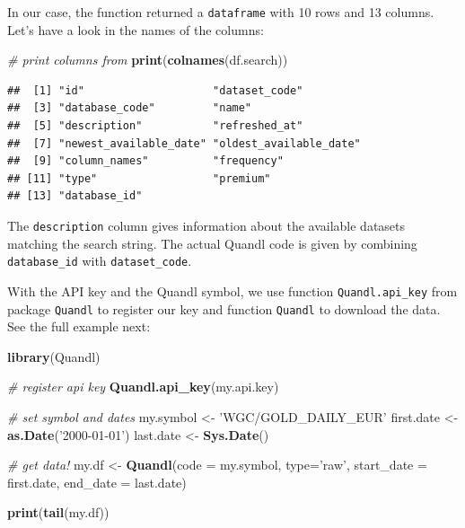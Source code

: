 \documentclass[11pt,]{book}
\newenvironment{Shaded}{\begin{snugshade}}{\end{snugshade}}
\newcommand{\KeywordTok}[1]{\textcolor[rgb]{0.27,0.27,0.27}{\textbf{#1}}}
\newcommand{\DataTypeTok}[1]{\textcolor[rgb]{0.27,0.27,0.27}{#1}}
\newcommand{\StringTok}[1]{\textcolor[rgb]{0.5,0.5,0.5}{#1}}
\newcommand{\CommentTok}[1]{\textcolor[rgb]{0.56,0.35,0.01}{\textit{#1}}}
\newcommand{\NormalTok}[1]{#1}
\begin{document}
In our case, the function returned a \texttt{dataframe} with 10 rows and
13 columns. Let's have a look in the names of the columns:

\begin{Shaded}
\begin{Highlighting}[]
\CommentTok{# print columns from }
\KeywordTok{print}\NormalTok{(}\KeywordTok{colnames}\NormalTok{(df.search))}
\end{Highlighting}
\end{Shaded}

\begin{verbatim}
##  [1] "id"                    "dataset_code"         
##  [3] "database_code"         "name"                 
##  [5] "description"           "refreshed_at"         
##  [7] "newest_available_date" "oldest_available_date"
##  [9] "column_names"          "frequency"            
## [11] "type"                  "premium"              
## [13] "database_id"
\end{verbatim}

The \texttt{description} column gives information about the available
datasets matching the search string. The actual Quandl code is given by
combining \texttt{database\_id} with \texttt{dataset\_code}.

With the API key and the Quandl symbol, we use function
\texttt{Quandl.api\_key} from package \texttt{Quandl} to register our
key and function \texttt{Quandl} to download the data. See the full
example next:  

\begin{Shaded}
\begin{Highlighting}[]
\KeywordTok{library}\NormalTok{(Quandl)}

\CommentTok{# register api key}
\KeywordTok{Quandl.api_key}\NormalTok{(my.api.key)}

\CommentTok{# set symbol and dates}
\NormalTok{my.symbol <-}\StringTok{ 'WGC/GOLD_DAILY_EUR'}
\NormalTok{first.date <-}\StringTok{ }\KeywordTok{as.Date}\NormalTok{(}\StringTok{'2000-01-01'}\NormalTok{)}
\NormalTok{last.date <-}\StringTok{ }\KeywordTok{Sys.Date}\NormalTok{()}

\CommentTok{# get data!}
\NormalTok{my.df <-}\StringTok{ }\KeywordTok{Quandl}\NormalTok{(}\DataTypeTok{code =}\NormalTok{ my.symbol,}
                \DataTypeTok{type=}\StringTok{'raw'}\NormalTok{, }
                \DataTypeTok{start_date =}\NormalTok{ first.date,}
                \DataTypeTok{end_date =}\NormalTok{ last.date)}

\KeywordTok{print}\NormalTok{(}\KeywordTok{tail}\NormalTok{(my.df))}
\end{Highlighting}
\end{Shaded}
\end{document}
